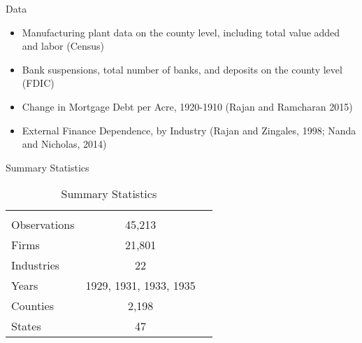 \documentclass[11pt]{beamer}
\begin{document}
\begin{frame}{Data}
\begin{itemize}
\item Manufacturing plant data on the county level, including total value added and labor (Census)
\item Bank suspensions, total number of banks, and deposits on the county level (FDIC)
\item Change in Mortgage Debt per Acre, 1920-1910 (Rajan and Ramcharan 2015)
\item External Finance Dependence, by Industry (Rajan and Zingales, 1998; Nanda and Nicholas, 2014)
\end{itemize}
\end{frame}

\begin{frame}{Summary Statistics}
\begin{table}  \caption{Summary Statistics} \tiny{
\begin{tabular}{lcc} 
\hline \hline \\
Observations & \multicolumn{1}{c}{45,213} \\
 Firms & \multicolumn{1}{c}{21,801} \\
 Industries & \multicolumn{1}{c}{22} \\
Years & \multicolumn{1}{c}{1929, 1931, 1933, 1935} \\
Counties & \multicolumn{1}{c}{2,198}\\
States & \multicolumn{1}{c}{47} \\
\hline                                                                                                                             

\end{tabular}
}
\end{table}
\end{frame}
\end{document}
